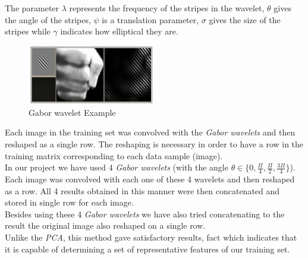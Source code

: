 \documentclass[a4paper, 11pt, twocolumn]{article}
\begin{document}
		The parameter $\lambda$ represents the frequency of the stripes in the wavelet, $\theta$ gives the angle of the stripes, $\psi$ is a translation parameter, $\sigma$ gives the size of the stripes while $\gamma$ indicates how elliptical they are.\\  
		\begin{figure}[!hbtp]
		   \centering
		   \includegraphics[width=0.5\textwidth]{gabor.png}
			\caption{Gabor wavelet Example}
	   	\end{figure}	
		\hspace*{10px}Each image in the training set was convolved with the \emph{Gabor wavelets} and then reshaped as a single row. The reshaping is necessary in order to have a row in the training matrix corresponding to each data sample (image).\\
		\hspace*{10px}In our project we have used 4 \emph{Gabor wavelets} (with the angle $\theta \in \{0, \frac{\Pi}{4}, \frac{\Pi}{2}, \frac{3\Pi}{4}\}$). Each image was convolved with each one of these 4 wavelets and then reshaped as a row. All 4 results obtained in this manner were then concatenated and stored in single row for each image.\\
		\hspace*{10px}Besides using these 4 \emph{Gabor wavelets} we have also tried concatenating to the result the original image also reshaped on a single row.\\
		\hspace*{10px}Unlike the \emph{PCA}, this method gave satisfactory results, fact which indicates that it is capable of determining a set of representative features of our training set.
\end{document}
